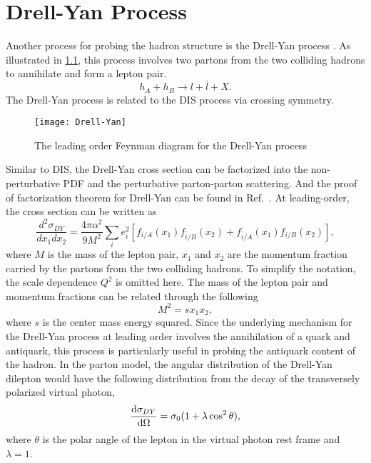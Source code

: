 \documentclass[../main.tex]{subfiles}
\begin{document}
\chapter{Drell-Yan Process}
\label{ch:DY}
Another process for probing the hadron structure is the Drell-Yan process \cite{drell1970}.
As illustrated in \cref{fig:DY}, this process involves two partons from the
two colliding hadrons to annihilate and form a lepton pair.
\begin{equation}
	h_A + h_B \rightarrow l + \bar{l} + X.
\end{equation}
The Drell-Yan process is related to the DIS process via crossing symmetry.
\begin{figure}[htbp!]
	\centering
	\texttt{[image: Drell-Yan]}
	\caption{The leading order Feynman diagram for the Drell-Yan process}
	\label{fig:DY}
\end{figure}
Similar to DIS, the Drell-Yan cross section can be factorized into the non-perturbative
PDF and the perturbative parton-parton scattering. And the proof of factorization
theorem for Drell-Yan can be found in Ref.~\cite{collins1989}. At leading-order,
the cross section can be written as
\begin{equation}
	\frac{d^2\sigma_{DY}}{dx_{1}dx_{2}} = \frac{4\pi\alpha^2}{9M^2}\sum_i e^2_i
	\left[f_{i/A}\left(x_1\right)f_{\bar{i}/B}\left(x_2\right) +
	f_{\bar{i}/A}\left(x_1\right)f_{i/B}\left(x_2\right)
	\right],
	\label{eq:DY_cs}
\end{equation}
where $M$ is the mass of the lepton pair, $x_1$ and $x_2$ are the momentum fraction
carried by the partons from the two colliding hadrons. To simplify the notation,
the scale dependence $Q^2$ is omitted here.
The mass of the lepton pair and momentum fractions can be related through the following
\begin{equation}
	M^2= sx_1x_2,
	\label{eq:mass}
\end{equation}
where $s$ is the center mass energy squared.
Since the underlying mechanism for the Drell-Yan process at leading order involves the annihilation
of a quark and antiquark, this process is particularly useful in probing the antiquark
content of the hadron.
In the parton model, the angular distribution of the Drell-Yan dilepton would have the following
distribution from the decay of the transversely polarized virtual photon,
\begin{equation}
	\dv{\sigma_{DY}}{\Omega} = \sigma_0(1+\lambda \cos^2\theta),
\end{equation}
where $\theta$ is the polar angle of the lepton in the virtual photon rest frame and $\lambda=1$.
\end{document}
